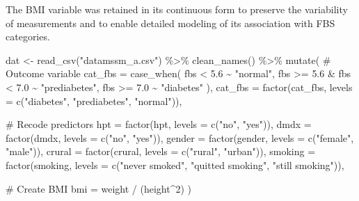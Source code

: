 \documentclass[
  letterpaper,
  DIV=11,
  numbers=noendperiod]{scrartcl}
\newenvironment{Shaded}{\begin{snugshade}}{\end{snugshade}}
\newcommand{\AttributeTok}[1]{\textcolor[rgb]{0.40,0.45,0.13}{#1}}
\newcommand{\CommentTok}[1]{\textcolor[rgb]{0.37,0.37,0.37}{#1}}
\newcommand{\DecValTok}[1]{\textcolor[rgb]{0.68,0.00,0.00}{#1}}
\newcommand{\FloatTok}[1]{\textcolor[rgb]{0.68,0.00,0.00}{#1}}
\newcommand{\FunctionTok}[1]{\textcolor[rgb]{0.28,0.35,0.67}{#1}}
\newcommand{\NormalTok}[1]{\textcolor[rgb]{0.00,0.23,0.31}{#1}}
\newcommand{\OtherTok}[1]{\textcolor[rgb]{0.00,0.23,0.31}{#1}}
\newcommand{\SpecialCharTok}[1]{\textcolor[rgb]{0.37,0.37,0.37}{#1}}
\newcommand{\StringTok}[1]{\textcolor[rgb]{0.13,0.47,0.30}{#1}}
\begin{document}
The BMI variable was retained in its continuous form to preserve the
variability of measurements and to enable detailed modeling of its
association with FBS categories.

\begin{Shaded}
\begin{Highlighting}[]
\NormalTok{dat }\OtherTok{\textless{}{-}} \FunctionTok{read\_csv}\NormalTok{(}\StringTok{"datamssm\_a.csv"}\NormalTok{) }\SpecialCharTok{\%\textgreater{}\%}
  \FunctionTok{clean\_names}\NormalTok{() }\SpecialCharTok{\%\textgreater{}\%}
  \FunctionTok{mutate}\NormalTok{(}
    \CommentTok{\# Outcome variable}
    \AttributeTok{cat\_fbs =} \FunctionTok{case\_when}\NormalTok{(}
\NormalTok{      fbs }\SpecialCharTok{\textless{}} \FloatTok{5.6} \SpecialCharTok{\textasciitilde{}} \StringTok{"normal"}\NormalTok{,}
\NormalTok{      fbs }\SpecialCharTok{\textgreater{}=} \FloatTok{5.6} \SpecialCharTok{\&}\NormalTok{ fbs }\SpecialCharTok{\textless{}} \FloatTok{7.0} \SpecialCharTok{\textasciitilde{}} \StringTok{"prediabetes"}\NormalTok{,}
\NormalTok{      fbs }\SpecialCharTok{\textgreater{}=} \FloatTok{7.0} \SpecialCharTok{\textasciitilde{}} \StringTok{"diabetes"}
\NormalTok{    ),}
    \AttributeTok{cat\_fbs =} \FunctionTok{factor}\NormalTok{(cat\_fbs, }\AttributeTok{levels =} \FunctionTok{c}\NormalTok{(}\StringTok{"diabetes"}\NormalTok{, }\StringTok{"prediabetes"}\NormalTok{, }\StringTok{"normal"}\NormalTok{)),}

    \CommentTok{\# Recode predictors}
    \AttributeTok{hpt =} \FunctionTok{factor}\NormalTok{(hpt, }\AttributeTok{levels =} \FunctionTok{c}\NormalTok{(}\StringTok{"no"}\NormalTok{, }\StringTok{"yes"}\NormalTok{)),}
    \AttributeTok{dmdx =} \FunctionTok{factor}\NormalTok{(dmdx, }\AttributeTok{levels =} \FunctionTok{c}\NormalTok{(}\StringTok{"no"}\NormalTok{, }\StringTok{"yes"}\NormalTok{)),}
    \AttributeTok{gender =} \FunctionTok{factor}\NormalTok{(gender, }\AttributeTok{levels =} \FunctionTok{c}\NormalTok{(}\StringTok{"female"}\NormalTok{, }\StringTok{"male"}\NormalTok{)),}
    \AttributeTok{crural =} \FunctionTok{factor}\NormalTok{(crural, }\AttributeTok{levels =} \FunctionTok{c}\NormalTok{(}\StringTok{"rural"}\NormalTok{, }\StringTok{"urban"}\NormalTok{)),}
    \AttributeTok{smoking =} \FunctionTok{factor}\NormalTok{(smoking, }
                     \AttributeTok{levels =} \FunctionTok{c}\NormalTok{(}\StringTok{"never smoked"}\NormalTok{, }\StringTok{"quitted smoking"}\NormalTok{, }\StringTok{"still smoking"}\NormalTok{)),}

    \CommentTok{\# Create BMI}
    \AttributeTok{bmi =}\NormalTok{ weight }\SpecialCharTok{/}\NormalTok{ (height}\SpecialCharTok{\^{}}\DecValTok{2}\NormalTok{)}
\NormalTok{  )}
\end{Highlighting}
\end{Shaded}
\end{document}
